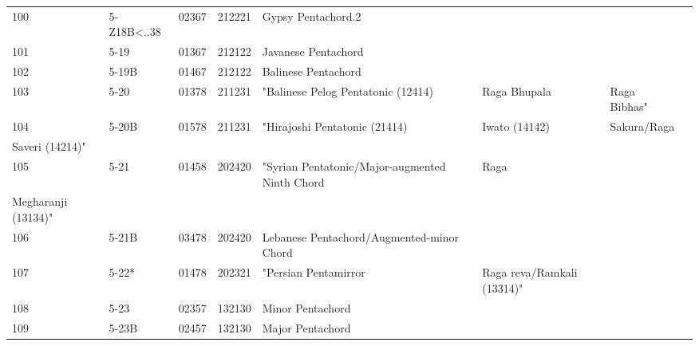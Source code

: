 \begin{table}[h]
\begin{tabular}{lllll}
100                    & 5-Z18B\textless..38 & 02367   & 212221    & Gypsy Pentachord.2                                         &                             &                   &      &     \\
101                    & 5-19                & 01367   & 212122    & Javanese Pentachord                                        &                             &                   &      &     \\
102                    & 5-19B               & 01467   & 212122    & Balinese Pentachord                                        &                             &                   &      &     \\
103                    & 5-20                & 01378   & 211231    & "Balinese Pelog Pentatonic (12414)                         & Raga Bhupala                & Raga Bibhas"      &      &     \\
104                    & 5-20B               & 01578   & 211231    & "Hirajoshi Pentatonic (21414)                              & Iwato (14142)               & Sakura/Raga       &      &     \\
Saveri (14214)"        &                     &         &           &                                                            &                             &                   &      &     \\
105                    & 5-21                & 01458   & 202420    & "Syrian Pentatonic/Major-augmented Ninth Chord             & Raga                        &                   &      &     \\
Megharanji (13134)"    &                     &         &           &                                                            &                             &                   &      &     \\
106                    & 5-21B               & 03478   & 202420    & Lebanese Pentachord/Augmented-minor Chord                  &                             &                   &      &     \\
107                    & 5-22*               & 01478   & 202321    & "Persian Pentamirror                                       & Raga reva/Ramkali (13314)"  &                   &      &     \\
108                    & 5-23                & 02357   & 132130    & Minor Pentachord                                           &                             &                   &      &     \\
109                    & 5-23B               & 02457   & 132130    & Major Pentachord                                           &                             &                   &      &     \\

\end{tabular}
\end{table}
